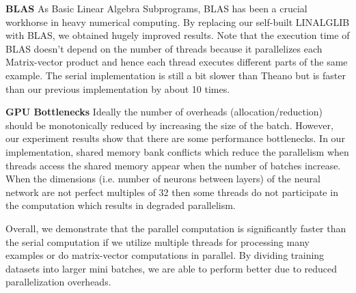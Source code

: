 \textbf{BLAS} As Basic Linear Algebra Subprograms, BLAS has been a crucial workhorse in heavy numerical computing.
By replacing our self-built LINALGLIB with BLAS, we obtained hugely improved results.
Note that the execution time of BLAS doesn't depend on the number of threads because it parallelizes each Matrix-vector product and hence each thread executes different parts of the same example.
The serial implementation is still a bit slower than Theano but is faster than our previous implementation by about 10 times.

\textbf{GPU Bottlenecks} Ideally  the number of overheads (allocation/reduction) should be monotonically reduced by increasing the size of the batch.
However, our experiment results show that there are some performance bottlenecks. In our implementation, shared memory bank conflicts which reduce the parallelism when threads access the shared memory appear when the number of batches increase.
When the dimensions (i.e. number of neurons between layers) of the neural network are not perfect multiples of 32 then some threads do not participate in the computation which results in degraded parallelism.

Overall, we demonstrate that the parallel computation is significantly faster than the serial computation if we utilize multiple threads for processing many examples or do matrix-vector computations in parallel.
By dividing training datasets into larger mini batches, we are able to perform better due to reduced parallelization overheads.